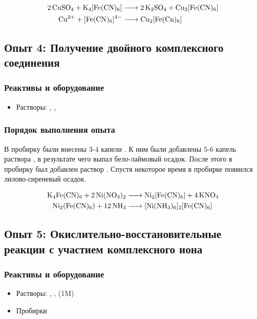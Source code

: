 \documentclass[a4paper, 12pt]{article}
\begin{document}
\begin{align*}
	\ce{2CuSO4 + K4[Fe(CN)6] &-> 2K2SO4 + Cu2[Fe(CN)6]}\\
	\ce{Cu^2+ + [Fe(CN)6]^4- &-> Cu2[Fe(Cn)6]}
\end{align*}


\subsection{Опыт 4: Получение двойного комплексного соединения}


\subsubsection{Реактивы и оборудование}

\begin{itemize}
	\item Растворы: , , 
\end{itemize}

\subsubsection{Порядок выполнения опыта}

В пробирку были внесены 3-4 капели . К ним были добавлены 5-6 капель раствора , в результате чего выпал бело-лаймовый осадок. После этого в пробирку был добавлен раствор . Спустя некоторое время в пробирке появился лилово-сиреневый осадок.

\begin{align}
	\ce{K4Fe(CN)6 + 2Ni(NO3)2 &-> Ni2[Fe(CN)6] + 4KNO3} \\
	\ce{Ni2(Fe(CN)6) + 12NH3 &-> [Ni(NH3)6]2[Fe(CN)6]}
\end{align}

\subsection{Опыт 5: Окислительно-восстановительные реакции с участием комплексного иона}

\subsubsection{Реактивы и оборудование}

\begin{itemize}
	\item Растворы: , ,  (1M)
	
	\item Пробирки
\end{itemize}
\end{document}
